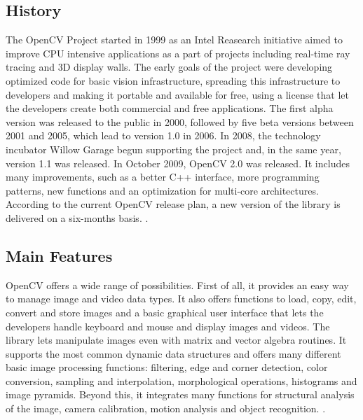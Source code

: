 	\subsection*{History}
	The \mbox{OpenCV} Project started in 1999 as an Intel Reasearch initiative aimed to improve CPU intensive applications as a part of projects including real-time ray tracing and 3D display walls. The early goals of the project were developing optimized code for basic vision infrastructure, spreading this infrastructure to developers and making it portable and available for free, using a license that let the developers create both commercial and free applications.\newline
	The first alpha version was released to the public in 2000, followed by five beta versions between 2001 and 2005, which lead to version 1.0 in 2006. In 2008, the technology incubator Willow Garage begun supporting the project and, in the same year, version 1.1  was released.
	In October 2009, \mbox{OpenCV} 2.0 was released. It includes many improvements, such as a better C++ interface, more programming patterns, new functions and an optimization for multi-core architectures. According to the current \mbox{OpenCV} release plan, a new version of the library is delivered on a six-months basis. \cite{OpenCV:ChangeLogs}.
	
	\subsection*{Main Features}
	\mbox{OpenCV} offers a wide range of possibilities. First of all, it provides an easy way to manage image and video data types. It also offers functions to load, copy, edit, convert and store images and a basic graphical user interface that lets  the developers handle keyboard and mouse and display images and videos. The library lets manipulate images even with matrix and vector algebra routines. It supports the most common dynamic data structures and offers many different basic image processing functions: filtering, edge and corner detection, color conversion, sampling and interpolation, morphological operations, histograms and image pyramids. Beyond this, it integrates many functions for structural analysis of the image, camera calibration, motion analysis and object recognition. \cite{Agam2006}.
